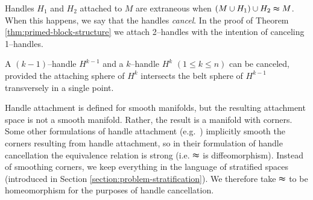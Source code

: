 Handles $H_1$ and $H_2$ attached to $M$ are extraneous when $(M\cup H_1)\cup H_2\thickapprox M$.
When this happens, we say that the handles \emph{cancel}.
In the proof of Theorem \ref{thm:primed-block-structure} we attach 2--handles with the intention of canceling 1--handles.


\begin{prop}
	A $(k-1)$--handle $H^{k-1}$ and a $k$--handle $H^k$ $(1\leq k\leq n)$ can be canceled, provided the attaching sphere of $H^k$ intersects the belt sphere of $H^{k-1}$ transversely in a single point.
\end{prop}

Handle attachment is defined for smooth manifolds, but the resulting attachment space is not a smooth manifold.
Rather, the result is a manifold with corners.
Some other formulations of handle attachment (e.g.\ \cite{GompStip}) implicitly smooth the corners resulting from handle attachment, so in their formulation of handle cancellation the equivalence relation is strong (i.e. $\thickapprox$ is diffeomorphism).
Instead of smoothing corners, we keep everything in the language of stratified spaces (introduced in Section \ref{section:problem-stratification}).
We therefore take $\thickapprox$ to be homeomorphism for the purposes of handle cancellation.




